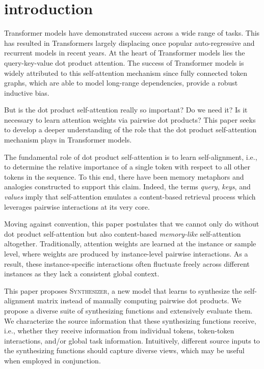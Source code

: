 \documentclass{article}
\begin{document}
\section{introduction}

Transformer models \citep{vaswani2017attention} have demonstrated success across a wide range of tasks. This has resulted in Transformers largely displacing once popular auto-regressive and recurrent models in recent years. At the heart of Transformer models lies the query-key-value dot product attention.  The success of Transformer models is widely attributed to this self-attention mechanism since fully connected token graphs, which are able to model long-range dependencies, provide a robust inductive bias.

But is the dot product self-attention really so important? Do we need it? Is it necessary to learn attention weights  via pairwise dot products? This paper seeks to develop a deeper understanding of the role that the dot product self-attention mechanism plays in Transformer models. 

The fundamental role of dot product self-attention is to learn self-alignment, i.e., to determine the relative importance of a single token with respect to all other tokens in the sequence. To this end, there have been memory metaphors and analogies constructed to support this claim. Indeed, the terms \textit{query}, \textit{keys}, and \textit{values} imply that self-attention emulates a content-based retrieval process which leverages pairwise interactions at its very core. 

Moving against convention, this paper postulates that we cannot only do without dot product self-attention but also content-based \textit{memory-like} self-attention altogether. Traditionally, attention weights are learned at the instance or sample level, where weights are produced by instance-level pairwise interactions. As a result, these instance-specific interactions often fluctuate freely across different instances as they lack a consistent global context.
 
This paper proposes \textsc{Synthesizer}, a new model that learns to synthesize the self-alignment matrix instead of manually computing pairwise dot products. We propose a diverse suite of synthesizing functions and extensively evaluate them. We characterize the source information that these synthesizing functions receive, i.e., whether they receive information from individual tokens, token-token interactions, and/or global task information. Intuitively, different source inputs to the synthesizing functions should capture diverse views, which may be useful when employed in conjunction.
 
\end{document}
